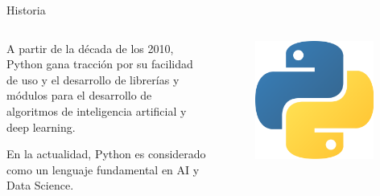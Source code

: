 \documentclass[10pt]{beamer}
\begin{document}
\begin{frame}{Historia}
    \begin{columns}
        \begin{column}{0.6\textwidth}
            A partir de la década de los 2010, Python gana tracción por su facilidad de uso y el 
            desarrollo de librerías y módulos para el desarrollo de algoritmos de inteligencia artificial 
            y deep learning. 

            En la actualidad, Python es considerado como un lenguaje fundamental en AI y Data Science.

        \end{column}
        \begin{column}{0.4\textwidth}
            \begin{figure}[!h] 
                \centering
                \includegraphics[width=0.95\textwidth]{img/logo}
            \end{figure}
        \end{column}
    \end{columns}
    
\end{frame}
\end{document}
